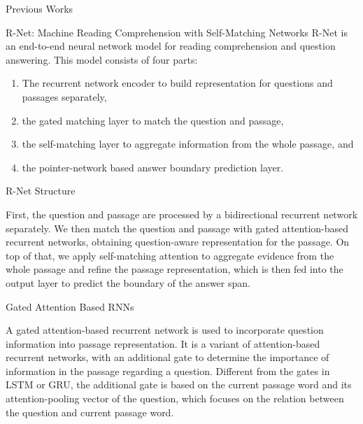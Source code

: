 \documentclass{article}
\begin{document}
\begin{psection}{Previous Works}
	\begin{psubsection}{R-Net: Machine Reading Comprehension with Self-Matching Networks}
		R-Net \citep{r-net} is an end-to-end neural network model for reading comprehension and question answering.
		This model consists of four parts:
		\begin{enumerate}
			\item The recurrent network encoder to build representation for questions and passages separately,
			\item the gated matching layer to match the question and passage,
			\item the self-matching layer to aggregate information from the whole passage, and
			\item the pointer-network based answer boundary prediction layer.
		\end{enumerate}



		\begin{subsubsection}{R-Net Structure}

			\sloppy
			First, the question and passage are processed by a bidirectional recurrent network separately. We then match the question and passage with gated attention-based recurrent networks, obtaining question-aware representation for the passage. On top of that, we apply self-matching attention to aggregate evidence from the whole passage and refine the passage representation, which is then fed into the output layer to predict the boundary of the answer span.

		\end{subsubsection}

		\begin{subsubsection}{Gated Attention Based RNNs}

			A gated attention-based recurrent network is used to incorporate question information into passage representation. It is a variant of attention-based recurrent networks, with an additional gate to determine the importance of information in the passage regarding a question. Different from the gates in LSTM or GRU, the additional gate is based on the current passage word and its attention-pooling vector of the question, which focuses on the relation between the question and current passage word.


\end{subsubsection}
\end{psubsection}
\end{psection}
\end{document}
